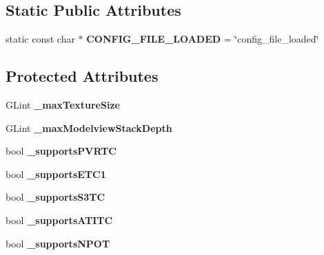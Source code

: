 \subsection*{Static Public Attributes}
\begin{DoxyCompactItemize}
\item 
\mbox{\label{classConfiguration_add0365612c0fc94c6ad7d56699858756}} 
static const char $\ast$ {\bfseries C\+O\+N\+F\+I\+G\+\_\+\+F\+I\+L\+E\+\_\+\+L\+O\+A\+D\+ED} = \char`\"{}config\+\_\+file\+\_\+loaded\char`\"{}
\end{DoxyCompactItemize}
\subsection*{Protected Attributes}
\begin{DoxyCompactItemize}
\item 
\mbox{\label{classConfiguration_a46dca84bc876e6558a4cb4248c240d33}} 
G\+Lint {\bfseries \+\_\+max\+Texture\+Size}
\item 
\mbox{\label{classConfiguration_a49964fa8f84c2d8f87ad30a93915874b}} 
G\+Lint {\bfseries \+\_\+max\+Modelview\+Stack\+Depth}
\item 
\mbox{\label{classConfiguration_acdd30e981827e337c01e3871344db78c}} 
bool {\bfseries \+\_\+supports\+P\+V\+R\+TC}
\item 
\mbox{\label{classConfiguration_a4980b914322120e90c1f4ee5a341a247}} 
bool {\bfseries \+\_\+supports\+E\+T\+C1}
\item 
\mbox{\label{classConfiguration_a5fa360da0e9ab75a336f593e9c8fdc65}} 
bool {\bfseries \+\_\+supports\+S3\+TC}
\item 
\mbox{\label{classConfiguration_abc1d3a31e0f39154ed0edde0b6cfd353}} 
bool {\bfseries \+\_\+supports\+A\+T\+I\+TC}
\item 
\mbox{\label{classConfiguration_a7ca873025ca36b9bde20a89832ac398c}} 
bool {\bfseries \+\_\+supports\+N\+P\+OT}
\item 
\mbox{\label{classConfiguration_a4df545e06814b59d9c194ee94f82b197}} 

\end{DoxyCompactItemize}
